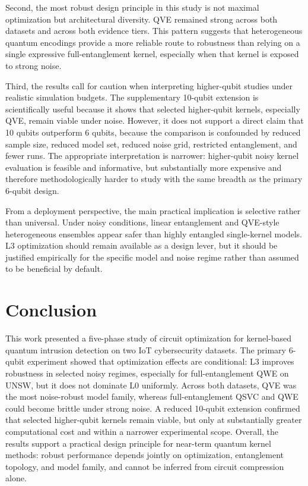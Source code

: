 \documentclass{ieeeaccess}
\begin{document}
Second, the most robust design principle in this study is not maximal optimization but architectural diversity. QVE remained strong across both datasets and across both evidence tiers. This pattern suggests that heterogeneous quantum encodings provide a more reliable route to robustness than relying on a single expressive full-entanglement kernel, especially when that kernel is exposed to strong noise.

Third, the results call for caution when interpreting higher-qubit studies under realistic simulation budgets. The supplementary 10-qubit extension is scientifically useful because it shows that selected higher-qubit kernels, especially QVE, remain viable under noise. However, it does not support a direct claim that 10 qubits outperform 6 qubits, because the comparison is confounded by reduced sample size, reduced model set, reduced noise grid, restricted entanglement, and fewer runs. The appropriate interpretation is narrower: higher-qubit noisy kernel evaluation is feasible and informative, but substantially more expensive and therefore methodologically harder to study with the same breadth as the primary 6-qubit design.

From a deployment perspective, the main practical implication is selective rather than universal. Under noisy conditions, linear entanglement and QVE-style heterogeneous ensembles appear safer than highly entangled single-kernel models. L3 optimization should remain available as a design lever, but it should be justified empirically for the specific model and noise regime rather than assumed to be beneficial by default.

\section{Conclusion}
\label{sec:conclusion}

This work presented a five-phase study of circuit optimization for kernel-based quantum intrusion detection on two IoT cybersecurity datasets. The primary 6-qubit experiment showed that optimization effects are conditional: L3 improves robustness in selected noisy regimes, especially for full-entanglement QWE on UNSW, but it does not dominate L0 uniformly. Across both datasets, QVE was the most noise-robust model family, whereas full-entanglement QSVC and QWE could become brittle under strong noise. A reduced 10-qubit extension confirmed that selected higher-qubit kernels remain viable, but only at substantially greater computational cost and within a narrower experimental scope. Overall, the results support a practical design principle for near-term quantum kernel methods: robust performance depends jointly on optimization, entanglement topology, and model family, and cannot be inferred from circuit compression alone.
\end{document}
